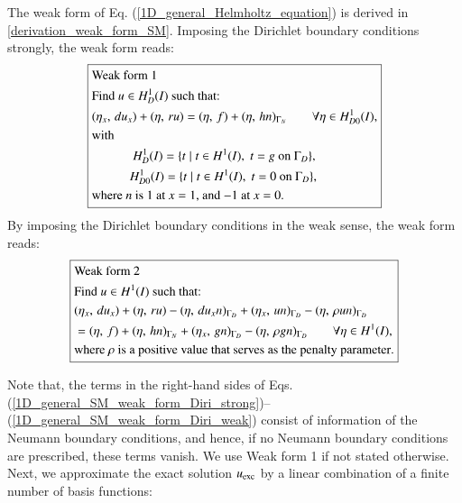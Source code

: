 \documentclass[review,3p]{elsarticle}
\begin{document}
The weak form of Eq. (\ref{1D_general_Helmholtz_equation}) is derived in \ref{derivation_weak_form_SM}. Imposing the Dirichlet boundary conditions strongly, the weak form reads:
\begin{equation}
\centering
\boxed{ 
\begin{aligned}
&\text{Weak~form}~ 1 ~~~~~~~~~\\
&\text{Find $u \in H _D^1 (I)$ such that:} \\
&({ \eta} _{ x }, \, du _{ x }  ) + (\eta, \, ru) = (\eta, \, f ) + (\eta, \, hn)_{\Gamma _N} \qquad \forall \eta \in H _{D0}^1 (I),\\
&\text{with} \\
&~~~~~~~~~~~~~H_{D} ^1 (I) = \{t \; | \; t \in H^1 (I), \; t = g \text{ on } \Gamma _D \},  \\
&~~~~~~~~~~~~H_{D0} ^1 (I) = \{t \; | \; t \in H^1 (I), \; t = 0 \text{ on } \Gamma _D\},\\
&\text{where } {n} \text{ is 1 at $x=1$, and $-1$ at $x=0$.}
\end{aligned}		\label{1D_general_SM_weak_form_Diri_strong} 
}
\end{equation}
By imposing the Dirichlet boundary conditions in the weak sense\cite{freund1995weakly}, the weak form reads:
\begin{equation}
\centering
\boxed{
\begin{aligned}
&\text{Weak~form}~ 2 ~~~~~~~~~\\
&\text{Find } u \in H ^1 (I) \text{ such that:}\\
& ( { \eta} _{ x }, \, du_x) + (\eta, \, ru) - (\eta, \, du_x n )_{\Gamma _D} + (\eta _x, \, u n )_{\Gamma _D} - (\eta, \, \rho u n )_{\Gamma _D} \\ 
&= (\eta, \, f ) + (\eta, \, h n )_{\Gamma _N} + (\eta _x, \, g n )_{\Gamma _D} - (\eta, \, \rho g n )_{\Gamma _D} \qquad \forall \eta \in H ^1 (I), \\
&\text{where } \rho \text{ is a } \text{{positive}} \text{ value that serves as the penalty parameter}.
\end{aligned}	\label{1D_general_SM_weak_form_Diri_weak}
}
\end{equation}

\noindent Note that, the terms in the right-hand sides of Eqs. (\ref{1D_general_SM_weak_form_Diri_strong})--(\ref{1D_general_SM_weak_form_Diri_weak}) consist of information of the Neumann boundary conditions, and hence, if no Neumann boundary conditions are prescribed, these terms vanish. We use Weak form 1 if not stated otherwise.
Next, we approximate the exact solution $u_{\rm exc}$ by a linear combination of a finite number of basis functions:
\end{document}
